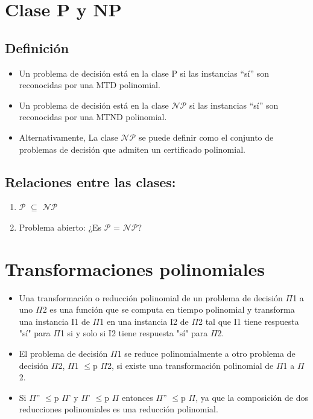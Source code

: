 \documentclass[a4paper,10pt]{article}
\begin{document}
\section{Clase P y NP}

\subsection{Definición}

	\begin{itemize}
		\item 	Un problema de decisión está en la clase P si las instancias “sí” son reconocidas por una MTD polinomial.
		\item 	Un problema de decisión está en la clase $\mathcal{NP}$ si las instancias “sí” son reconocidas por una MTND polinomial.
		\item 	Alternativamente, La clase $\mathcal{NP}$ se puede definir como el conjunto de problemas de decisión que admiten un certificado polinomial.
	\end{itemize}

\subsection{Relaciones entre las clases:}
	
	\begin{enumerate}
		\item $\mathcal{P}$ $\subseteq$ $\mathcal{NP}$
		\item Problema abierto: ¿Es $\mathcal{P}$ = $\mathcal{NP}$?
	\end{enumerate}


\section{Transformaciones polinomiales}

	\begin{itemize}
		\item Una transformación o reducción polinomial de un problema de decisión $\Pi$1 a uno $\Pi$2 es una función que se computa en tiempo polinomial y transforma una instancia I1 de $\Pi$1 en una instancia I2 de $\Pi$2 tal que I1 tiene respuesta "sí" para $\Pi$1 si y solo si I2 tiene respuesta "sí" para $\Pi$2.  
		\item  El problema de decisión $\Pi$1 se reduce polinomialmente a otro problema de decisión $\Pi$2, $\Pi$1 $\leq$p $\Pi$2, si existe una transformación polinomial de $\Pi$1 a $\Pi$2. 
		\item Si $\Pi$'' $\leq$p $\Pi$' y $\Pi$' $\leq$p $\Pi$ entonces $\Pi$'' $\leq$p $\Pi$, ya que la composición de dos reducciones polinomiales es una reducción polinomial.
	
	\end{itemize}
\end{document}
